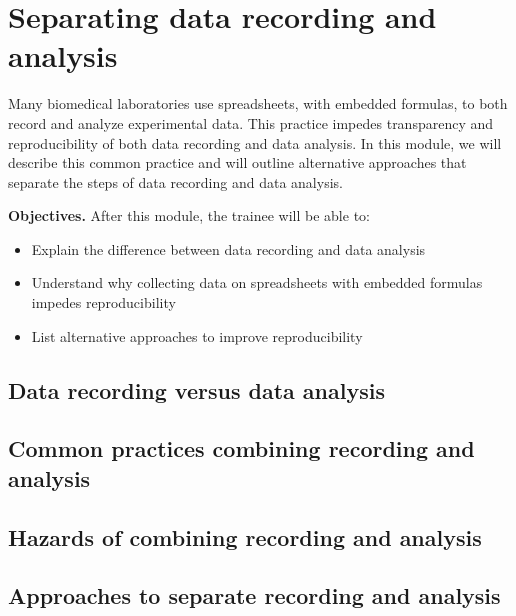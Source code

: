\documentclass[]{tufte-book}
\providecommand{\tightlist}{%
  \setlength{\itemsep}{0pt}\setlength{\parskip}{0pt}}
\begin{document}
\hypertarget{separating-data-recording-and-analysis-11}{%
\section{Separating data recording and analysis}\label{separating-data-recording-and-analysis-11}}

Many biomedical laboratories use spreadsheets, with embedded formulas, to both
record and analyze experimental data. This practice impedes transparency and
reproducibility of both data recording and data analysis. In this module, we
will describe this common practice and will outline alternative approaches that
separate the steps of data recording and data analysis.

\textbf{Objectives.} After this module, the trainee will be able to:

\begin{itemize}
\tightlist
\item
  Explain the difference between data recording and data analysis
\item
  Understand why collecting data on spreadsheets with embedded formulas impedes
  reproducibility
\item
  List alternative approaches to improve reproducibility
\end{itemize}

\hypertarget{data-recording-versus-data-analysis-11}{%
\subsection{Data recording versus data analysis}\label{data-recording-versus-data-analysis-11}}

\hypertarget{common-practices-combining-recording-and-analysis-11}{%
\subsection{Common practices combining recording and analysis}\label{common-practices-combining-recording-and-analysis-11}}

\hypertarget{hazards-of-combining-recording-and-analysis-11}{%
\subsection{Hazards of combining recording and analysis}\label{hazards-of-combining-recording-and-analysis-11}}

\hypertarget{approaches-to-separate-recording-and-analysis-11}{%
\subsection{Approaches to separate recording and analysis}\label{approaches-to-separate-recording-and-analysis-11}}
\end{document}
